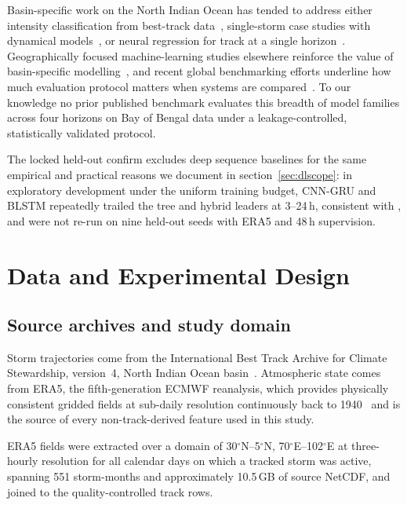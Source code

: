 \documentclass{ametsocv6.1}
\newcommand{\bob}{Bay of Bengal}
\newcommand{\era}{ERA5}
\begin{document}
Basin-specific work on the North Indian Ocean has tended to address either
intensity classification from best-track
data~\citep{kar2021tropical}, single-storm case studies with dynamical
models~\citep{hossain2021track}, or neural regression for track at a single
horizon~\citep{krishnamurti2010ann}. Geographically focused machine-learning
studies elsewhere reinforce the value of basin-specific
modelling~\citep{pan2024guangdong}, and recent global benchmarking efforts
underline how much evaluation protocol matters when systems are
compared~\citep{gomez2026tcbench}. To our knowledge no prior published benchmark
evaluates this breadth of model families across four horizons on \bob{} data
under a leakage-controlled, statistically validated protocol.

The locked held-out confirm excludes deep sequence baselines for the same
empirical and practical reasons we document in section~\ref{sec:dlscope}: in
exploratory development under the uniform training budget, CNN-GRU and BLSTM
repeatedly trailed the tree and hybrid leaders at 3--24\,h, consistent with
\citet{grinsztajn2022tree}, and were not re-run on nine held-out seeds with
\era{} and 48\,h supervision.

\section{Data and Experimental Design}
\label{sec:data}
\subsection{Source archives and study domain}
Storm trajectories come from the International Best Track Archive for Climate
Stewardship, version~4, North Indian Ocean
basin~\citep{knapp2010ibtracs,gahtan2024ibtracs}. Atmospheric state comes from
\era{}, the fifth-generation ECMWF reanalysis, which provides physically
consistent gridded fields at sub-daily resolution continuously back to
1940~\citep{hersbach2023era5} and is the source of every non-track-derived
feature used in this study.

\era{} fields were extracted over a domain of 30$^\circ$N--5$^\circ$N,
70$^\circ$E--102$^\circ$E at three-hourly resolution for all calendar days on
which a tracked storm was active, spanning 551 storm-months and approximately
10.5\,GB of source NetCDF, and joined to the quality-controlled track rows.
\end{document}
